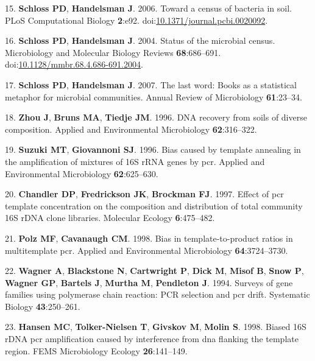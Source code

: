 \documentclass[11pt,]{article}
\begin{document}
\leavevmode\hypertarget{ref-Schloss2006c}{}%
15. \textbf{Schloss PD}, \textbf{Handelsman J}. 2006. Toward a census of
bacteria in soil. PLoS Computational Biology \textbf{2}:e92.
doi:\href{https://doi.org/10.1371/journal.pcbi.0020092}{10.1371/journal.pcbi.0020092}.

\leavevmode\hypertarget{ref-Schloss2004b}{}%
16. \textbf{Schloss PD}, \textbf{Handelsman J}. 2004. Status of the
microbial census. Microbiology and Molecular Biology Reviews
\textbf{68}:686--691.
doi:\href{https://doi.org/10.1128/mmbr.68.4.686-691.2004}{10.1128/mmbr.68.4.686-691.2004}.

\leavevmode\hypertarget{ref-Schloss2007}{}%
17. \textbf{Schloss PD}, \textbf{Handelsman J}. 2007. The last word:
Books as a statistical metaphor for microbial communities. Annual Review
of Microbiology \textbf{61}:23--34.

\leavevmode\hypertarget{ref-Zhou1996}{}%
18. \textbf{Zhou J}, \textbf{Bruns MA}, \textbf{Tiedje JM}. 1996. DNA
recovery from soils of diverse composition. Applied and Environmental
Microbiology \textbf{62}:316--322.

\leavevmode\hypertarget{ref-Suzuki1996}{}%
19. \textbf{Suzuki MT}, \textbf{Giovannoni SJ}. 1996. Bias caused by
template annealing in the amplification of mixtures of 16S rRNA genes by
pcr. Applied and Environmental Microbiology \textbf{62}:625--630.

\leavevmode\hypertarget{ref-Chandler1997}{}%
20. \textbf{Chandler DP}, \textbf{Fredrickson JK}, \textbf{Brockman FJ}.
1997. Effect of pcr template concentration on the composition and
distribution of total community 16S rDNA clone libraries. Molecular
Ecology \textbf{6}:475--482.

\leavevmode\hypertarget{ref-Polz1998}{}%
21. \textbf{Polz MF}, \textbf{Cavanaugh CM}. 1998. Bias in
template-to-product ratios in multitemplate pcr. Applied and
Environmental Microbiology \textbf{64}:3724--3730.

\leavevmode\hypertarget{ref-Wagner1994}{}%
22. \textbf{Wagner A}, \textbf{Blackstone N}, \textbf{Cartwright P},
\textbf{Dick M}, \textbf{Misof B}, \textbf{Snow P}, \textbf{Wagner GP},
\textbf{Bartels J}, \textbf{Murtha M}, \textbf{Pendleton J}. 1994.
Surveys of gene families using polymerase chain reaction: PCR selection
and pcr drift. Systematic Biology \textbf{43}:250--261.

\leavevmode\hypertarget{ref-Hansen1998}{}%
23. \textbf{Hansen MC}, \textbf{Tolker-Nielsen T}, \textbf{Givskov M},
\textbf{Molin S}. 1998. Biased 16S rDNA pcr amplification caused by
interference from dna flanking the template region. FEMS Microbiology
Ecology \textbf{26}:141--149.
\end{document}
